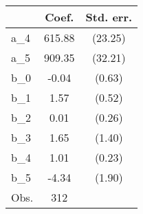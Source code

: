 {
\def\sym#1{\ifmmode^{#1}\else\(^{#1}\)\fi}
\begin{tabular}{l*{1}{cc}}
\hline\hline
                &    Coef.&Std. err.\\
\hline
a\_4             &   615.88&  (23.25)\\
a\_5             &   909.35&  (32.21)\\
b\_0             &    -0.04&   (0.63)\\
b\_1             &     1.57&   (0.52)\\
b\_2             &     0.01&   (0.26)\\
b\_3             &     1.65&   (1.40)\\
b\_4             &     1.01&   (0.23)\\
b\_5             &    -4.34&   (1.90)\\
\hline
Obs.            &      312&         \\
\hline\hline
\end{tabular}
}
